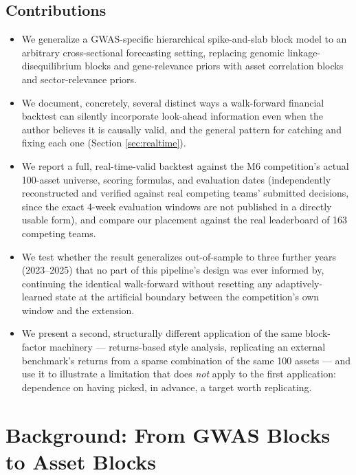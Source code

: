 \documentclass[11pt]{article}
\begin{document}
\subsection{Contributions}
\begin{itemize}[leftmargin=1.4em]
  \item We generalize a GWAS-specific hierarchical spike-and-slab block model
  to an arbitrary cross-sectional forecasting setting, replacing genomic
  linkage-disequilibrium blocks and gene-relevance priors with asset
  correlation blocks and sector-relevance priors.
  \item We document, concretely, several distinct ways a walk-forward
  financial backtest can silently incorporate look-ahead information even
  when the author believes it is causally valid, and the general pattern for
  catching and fixing each one (Section \ref{sec:realtime}).
  \item We report a full, real-time-valid backtest against the M6
  competition's actual 100-asset universe, scoring formulas, and evaluation
  dates (independently reconstructed and verified against real competing
  teams' submitted decisions, since the exact 4-week evaluation windows are
  not published in a directly usable form), and compare our placement against
  the real leaderboard of 163 competing teams.
  \item We test whether the result generalizes out-of-sample to three further
  years (2023--2025) that no part of this pipeline's design was ever informed
  by, continuing the identical walk-forward without resetting any adaptively-
  learned state at the artificial boundary between the competition's own
  window and the extension.
  \item We present a second, structurally different application of the same
  block-factor machinery --- returns-based style analysis, replicating an
  external benchmark's returns from a sparse combination of the same 100
  assets --- and use it to illustrate a limitation that does \emph{not} apply
  to the first application: dependence on having picked, in advance, a target
  worth replicating.
\end{itemize}

\section{Background: From GWAS Blocks to Asset Blocks}
\label{sec:background}
\end{document}

